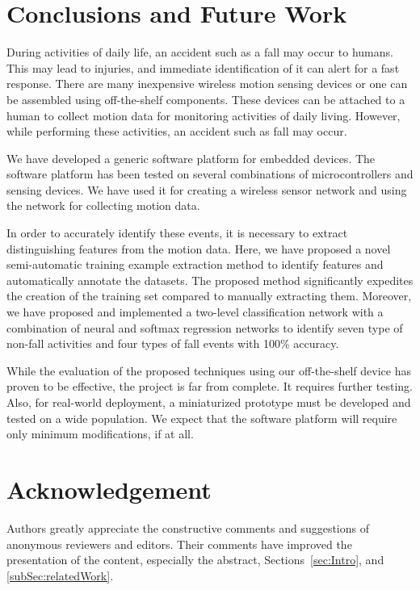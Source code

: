 \documentclass[]{IEEEtran}
\begin{document}
\section{Conclusions and Future Work}
  
During activities of daily life, an accident such as a fall may occur to
humans. This may lead to injuries, and immediate identification of it can alert
for a fast response.  There are many inexpensive wireless motion sensing
devices or one can be assembled using off-the-shelf components. These devices
can be attached to a human to collect motion data for monitoring activities of
daily living. However, while performing these activities, an accident such as
fall may occur.

We have developed a generic software platform for embedded devices. The
software platform has been tested on several combinations of microcontrollers
and sensing devices. We have used it for creating a wireless sensor network and
using the network for collecting motion data.

In order to accurately identify these events, it is necessary to extract
distinguishing features from the motion data. Here, we have proposed a novel
semi-automatic training example extraction method to identify features and
automatically annotate the datasets. The proposed method significantly
expedites the creation of the training set compared to manually extracting
them. Moreover, we have proposed and implemented a two-level classification
network with  a combination of neural and softmax regression networks to
identify seven type of non-fall activities and four types of fall events with
100\% accuracy. 

While the evaluation of the proposed techniques using our off-the-shelf device
has proven to be effective, the project is far from complete. It requires
further testing. Also, for real-world deployment, a miniaturized prototype must
be developed and tested on a wide population. We expect that the software
platform will require only minimum modifications, if at all.

\section*{Acknowledgement} \label{sec:Acknowledgement} Authors greatly
appreciate the constructive comments and suggestions of anonymous reviewers and editors. Their
comments have improved the presentation of the content, especially the abstract, Sections~\ref{sec:Intro}, and \ref{subSec:relatedWork}.
\end{document}
